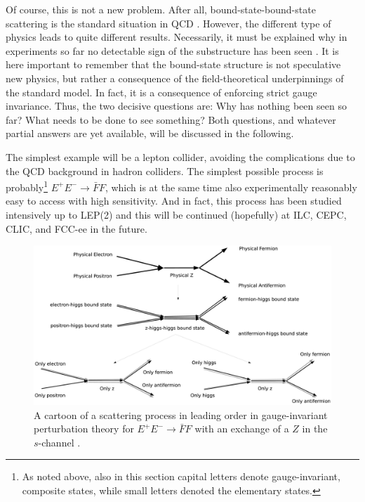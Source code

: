 \documentclass[final,12pt,3p,longtitle]{elsarticle}
\newcommand*{\1}{1\!\!\!\bot}
\begin{document}
Of course, this is not a new problem. After all, bound-state-bound-state scattering is the standard situation in QCD \cite{BeiglboCk:2006lfa,Bohm:2001yx,Dissertori:2003pj}. However, the different type of physics leads to quite different results. Necessarily, it must be explained why in experiments so far no detectable sign of the substructure has been seen \cite{pdg}. It is here important to remember that the bound-state structure is not speculative new physics, but rather a consequence of the field-theoretical underpinnings of the standard model. In fact, it is a consequence of enforcing strict gauge invariance. Thus, the two decisive questions are: Why has nothing been seen so far? What needs to be done to see something? Both questions, and whatever partial answers are yet available, will be discussed in the following.

The simplest example will be a lepton collider, avoiding the complications due to the QCD background in hadron colliders. The simplest possible process is probably\footnote{As noted above, also in this section capital letters denote gauge-invariant, composite states, while small letters denoted the elementary states.} $E^+E^-\to{\bar F}F$, which is at the same time also experimentally reasonably easy to access with high sensitivity. And in fact, this process has been studied intensively up to LEP(2) \cite{pdg} and this will be continued (hopefully) at ILC, CEPC, CLIC, and FCC-ee in the future.

\begin{figure}[!htbp]
\includegraphics[width=\linewidth]{scattering}
\caption{\label{fig:scattering}A cartoon of a scattering process in leading order in gauge-invariant perturbation theory for $E^+E^-\to{\bar F}F$ with an exchange of a $Z$ in the $s$-channel \cite{Maas:2017swq}.}
\end{figure}
\end{document}
